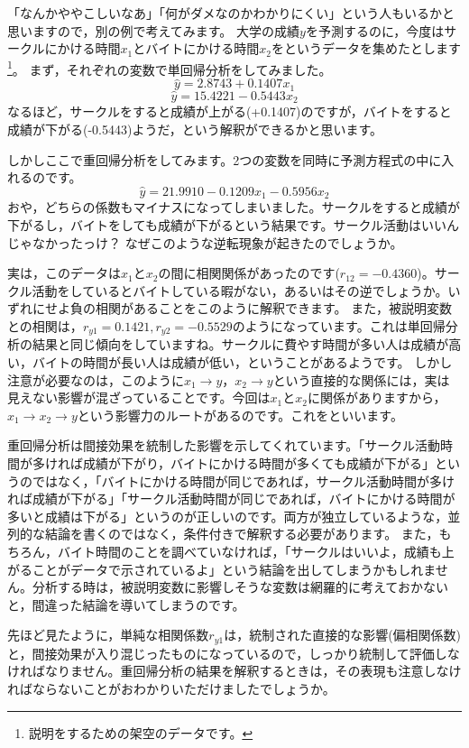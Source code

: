 \documentclass{ltjbook}
\begin{document}
「なんかややこしいなあ」「何がダメなのかわかりにくい」という人もいるかと思いますので，別の例で考えてみます。
大学の成績$y$を予測するのに，今度はサークルにかける時間$x_1$とバイトにかける時間$x_2$をというデータを集めたとします\footnote{説明をするための架空のデータです。}。
まず，それぞれの変数で単回帰分析をしてみました。
\[ \hat{y} = 2.8743 + 0.1407 x_1 \]
\[ \hat{y} = 15.4221 -0.5443 x_2 \]
なるほど，サークルをすると成績が上がる(+0.1407)のですが，バイトをすると成績が下がる(-0.5443)ようだ，という解釈ができるかと思います。

しかしここで重回帰分析をしてみます。2つの変数を同時に予測方程式の中に入れるのです。
\[\hat{y} = 21.9910 -0.1209 x_1 - 0.5956x_2\]
おや，どちらの係数もマイナスになってしまいました。サークルをすると成績が下がるし，バイトをしても成績が下がるという結果です。サークル活動はいいんじゃなかったっけ？ なぜこのような逆転現象が起きたのでしょうか。

実は，このデータは$x_1$と$x_2$の間に相関関係があったのです($r_{12}=-0.4360$)。サークル活動をしているとバイトしている暇がない，あるいはその逆でしょうか。いずれにせよ負の相関があることをこのように解釈できます。
また，被説明変数との相関は，$r_{y1}=0.1421,r_{y2}=-0.5529$のようになっています。これは単回帰分析の結果と同じ傾向をしていますね。サークルに費やす時間が多い人は成績が高い，バイトの時間が長い人は成績が低い，ということがあるようです。
しかし注意が必要なのは，このように$x_1 \to y$，$x_2 \to y$という直接的な関係には，実は見えない影響が混ざっていることです。今回は$x_1$と$x_2$に関係がありますから，$x_1 \to x_2 \to y$という影響力のルートがあるのです。これをといいます。

重回帰分析は間接効果を統制した影響を示してくれています。「サークル活動時間が多ければ成績が下がり，バイトにかける時間が多くても成績が下がる」というのではなく，「バイトにかける時間が同じであれば，サークル活動時間が多ければ成績が下がる」「サークル活動時間が同じであれば，バイトにかける時間が多いと成績は下がる」というのが正しいのです。両方が独立しているような，並列的な結論を書くのではなく，条件付きで解釈する必要があります。
また，もちろん，バイト時間のことを調べていなければ，「サークルはいいよ，成績も上がることがデータで示されているよ」という結論を出してしまうかもしれません。分析する時は，被説明変数に影響しそうな変数は網羅的に考えておかないと，間違った結論を導いてしまうのです。

先ほど見たように，単純な相関係数$r_{y1}$は，統制された直接的な影響(偏相関係数)と，間接効果が入り混じったものになっているので，しっかり統制して評価しなければなりません。重回帰分析の結果を解釈するときは，その表現も注意しなければならないことがおわかりいただけましたでしょうか。
\end{document}
